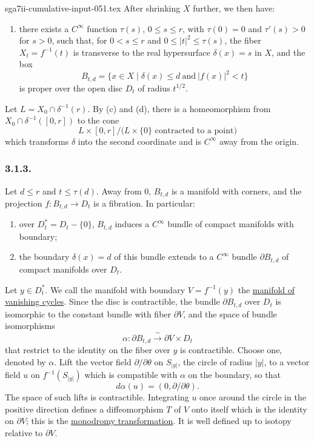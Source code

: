 \begin{filecontents*}{sga7ii-cumulative-input-051.tex}
After shrinking $X$ further, we then have:

\begin{enumerate}[label=(\alph*),start=5]
\item there exists a $C^\infty$ function $\tau(s)$, $0\leq s\leq r$,
  with $\tau(0)=0$ and $\tau'(s)>0$ for $s>0$, such that, for
  $0<s\leq r$ and $0\leq |t|^2\leq\tau(s)$, the fiber
  $X_t=f^{-1}(t)$ is transverse to the real hypersurface
  $\delta(x)=s$ in $X$, and the box
  \[
  B_{t,d}=\{x\in X\mid \delta(x)\leq d\ \text{and}\ |f(x)|^2<t\}
  \]
  is proper over the open disc $D_t$ of radius $t^{1/2}$.
\end{enumerate}

Let $L=X_0\cap\delta^{-1}(r)$.  By (c) and (d), there is a
homeomorphism from $X_0\cap\delta^{-1}([0,r])$ to the cone
\[
L\times[0,r]\big/\bigl(L\times\{0\}\text{ contracted to a point}\bigr)
\]
which transforms $\delta$ into the second coordinate and is
$C^\infty$ away from the origin.

\subsubsection*{3.1.3.}
Let $d\leq r$ and $t\leq\tau(d)$.  Away from $0$, $B_{t,d}$ is a
manifold with corners, and the projection $f:B_{t,d}\to D_t$ is a
fibration.  In particular:

\begin{enumerate}[label=(\alph*)]
\item over $D_t^*=D_t-\{0\}$, $B_{t,d}$ induces a $C^\infty$ bundle
  of compact manifolds with boundary;
\item the boundary $\delta(x)=d$ of this bundle extends to a
  $C^\infty$ bundle $\partial B_{t,d}$ of compact manifolds over
  $D_t$.
\end{enumerate}

Let $y\in D_t^*$.  We call the manifold with boundary
$V=f^{-1}(y)$ the \underline{manifold of vanishing cycles}.  Since the
disc is contractible, the bundle $\partial B_{t,d}$ over $D_t$ is
isomorphic to the constant bundle with fiber $\partial V$, and the
space of bundle isomorphisms
\[
\alpha:\partial B_{t,d}\xrightarrow{\ \sim\ }\partial V\times D_t
\]
that restrict to the identity on the fiber over $y$ is contractible.
Choose one, denoted by $\alpha$.  Lift the vector field
$\partial/\partial\theta$ on $S_{|y|}$, the circle of radius $|y|$,
to a vector field $u$ on $f^{-1}(S_{|y|})$ which is compatible with
$\alpha$ on the boundary, so that
\[
d\alpha(u)=(0,\partial/\partial\theta).
\]
The space of such lifts is contractible.  Integrating $u$ once around
the circle in the positive direction defines a diffeomorphism $T$ of
$V$ onto itself which is the identity on $\partial V$; this is the
\underline{monodromy transformation}.  It is well defined up to
isotopy relative to $\partial V$.


\end{filecontents*}
